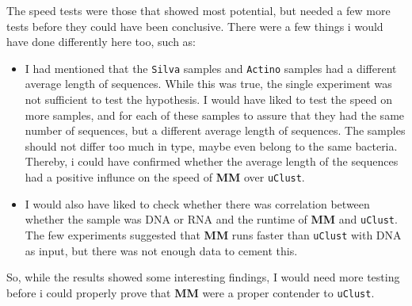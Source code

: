 \documentclass[../../main.tex]{subfiles}
\begin{document}
The speed tests were those that showed most potential, but needed a few more tests before they could have been conclusive. There were a few things i would have done differently here too, such as:
\begin{itemize}
\item I had mentioned that the {\tt Silva} samples and {\tt Actino} samples had a different average length of sequences. While this was true, the single experiment was not sufficient to test the hypothesis. I would have liked to test the speed on more samples, and for each of these samples to assure that they had the same number of sequences, but a different average length of sequences. The samples should not differ too much in type, maybe even belong to the same bacteria. Thereby, i could have confirmed whether the average length of the sequences had a positive influnce on the speed of {\bf MM} over {\tt uClust}.
\item I would also have liked to check whether there was correlation between whether the sample was DNA or RNA and the runtime of {\bf MM} and {\tt uClust}. The few experiments suggested that {\bf MM} runs faster than {\tt uClust} with DNA as input, but there was not enough data to cement this. 
\end{itemize}
So, while the results showed some interesting findings, I would need more testing before i could properly prove that {\bf MM} were a proper contender to {\tt uClust}.
\end{document}
